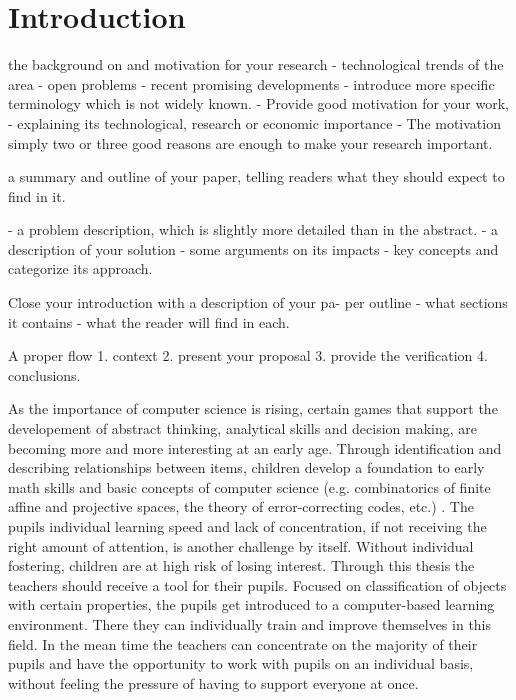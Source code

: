 
\setcounter{chapter}{0}

\chapter{Introduction}
\label{chap:introduction}

the background on and motivation for your research
- technological trends of the area
- open problems
- recent promising developments
- introduce more specific terminology which is not widely known.
- Provide good motivation for your work,
- explaining its technological, research or economic importance
- The motivation simply two or three good reasons are enough to
make your research important.

a summary and outline of your paper, telling readers what they should expect to find in it.

- a problem description, which is slightly more detailed than in the abstract.
- a description of your solution
- some arguments on its impacts
- key concepts and categorize its approach.

Close your introduction with a description of your pa-
per outline
- what sections it contains
- what the reader will find in each.

A proper flow
1. context
2. present your proposal
3. provide the verification
4. conclusions.

As the importance of computer science is rising, certain games that support the
developement of abstract thinking, analytical skills and decision making, are
becoming more and more interesting at an early age. Through identification and
describing relationships between items, children develop a foundation to early
math skills and basic concepts of computer science (e.g. combinatorics of finite
affine and projective spaces, the theory of error-correcting codes, etc.)
\cite{SET}. The pupils individual learning speed and lack of concentration, if
not receiving the right amount of attention, is another challenge by itself.
Without individual fostering, children are at high risk of losing interest.
Through this thesis the teachers should receive a tool for their pupils. Focused
on classification of objects with certain properties, the pupils get introduced
to a computer-based learning environment. There they can individually train and
improve themselves in this field. In the mean time the teachers can concentrate
on the majority of their pupils and have the opportunity to work with pupils on
an individual basis, without feeling the pressure of having to support everyone
at once.

